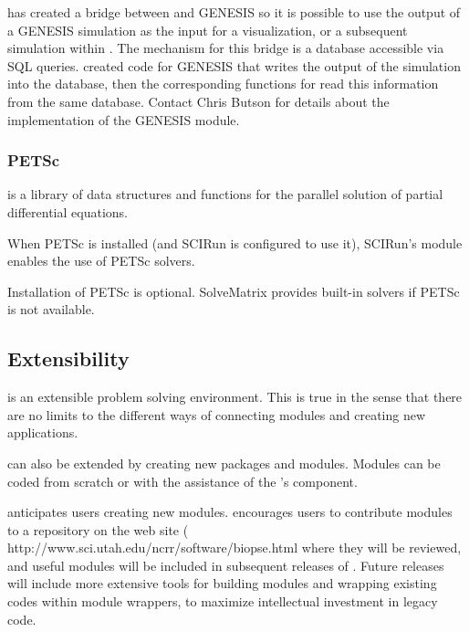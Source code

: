 \sci{} has created a bridge between \SR{} and GENESIS so it is possible
to use the output of a GENESIS simulation as the input for a
visualization, or a subsequent simulation within \BIOPSE{}.  The mechanism for
this bridge is a database accessible via SQL queries.  \sci{} created
code for GENESIS that writes the output of the simulation into the database, then the corresponding functions for \SR{} read this
information from the same database.   Contact Chris Butson
for details about the implementation of the GENESIS module.


\subsubsection{PETSc}

 is a library of
data structures and functions for the parallel solution of partial
differential equations.

When PETSc is installed (and SCIRun is configured to use it), SCIRun's
 module enables the use of PETSc solvers.

Installation of PETSc is optional. SolveMatrix provides built-in
solvers if PETSc is not available.

\subsection{Extensibility}
\label{sec:con-extend} 

\SR{} is an extensible  problem solving environment.
This is true in the sense that there are no limits to the
different ways of connecting modules and creating new applications.  

\sr{} can also be extended by creating new packages and modules.
Modules can be coded from scratch or with the assistance of the
\sr's  component.

\sci{} anticipates users  creating new modules. \sci{} 
encourages users to contribute modules to a repository on the \BIOPSE{}
web site  
( 
{http://www.sci.utah.edu/ncrr/software/biopse.html} where they will be reviewed, and useful modules will be included in subsequent releases of \sr{}.
Future releases will include more extensive tools for building modules
and wrapping existing codes within \SR{} module wrappers, to maximize
intellectual investment in legacy code.


